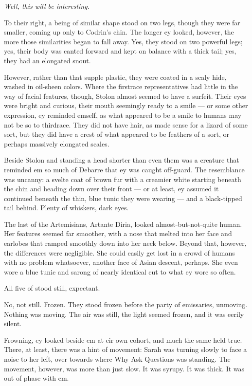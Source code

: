 \emph{Well, this will be interesting.}

To their right, a being of similar shape stood on two legs, though they were far smaller, coming up only to Codrin's chin. The longer ey looked, however, the more those similarities began to fall away. Yes, they stood on two powerful legs; yes, their body was canted forward and kept on balance with a thick tail; yes, they had an elongated snout.

However, rather than that supple plastic, they were coated in a scaly hide, washed in oil-sheen colors. Where the firstrace representatives had little in the way of facial features, though, Stolon almost seemed to have a surfeit. Their eyes were bright and curious, their mouth seemingly ready to a smile — or some other expression, ey reminded emself, as what appeared to be a smile to humans may not be so to thirdrace. They did not have hair, as made sense for a lizard of some sort, but they did have a crest of what appeared to be feathers of a sort, or perhaps massively elongated scales.

Beside Stolon and standing a head shorter than even them was a creature that reminded em so much of Debarre that ey was caught off-guard. The resemblance was uncanny: a svelte coat of brown fur with a creamier white starting beneath the chin and heading down over their front — or at least, ey assumed it continued beneath the thin, blue tunic they were wearing — and a black-tipped tail behind. Plenty of whiskers, dark eyes.

The last of the Artemisians, Artante Diria, looked almost-but-not-quite human. Her features seemed far smoother, with a nose that melted into her face and earlobes that ramped smoothly down into her neck below. Beyond that, however, the differences were negligible. She could easily get lost in a crowd of humans with no problem whatsoever, another face of Asian descent, perhaps. She even wore a blue tunic and sarong of nearly identical cut to what ey wore so often.

All five of stood still, expectant.

No, not still. Frozen. They stood frozen before the party of emissaries, unmoving. Nothing was moving. The air was still, the light seemed frozen, and it was eerily silent.

Frowning, ey looked beside em at eir own cohort, and much the same held true. There, at least, there was a hint of movement: Sarah was turning slowly to face a noise to her left, over towards where Why Ask Questions was standing. The movement, however, was more than just slow. It was syrupy. It was thick. It was out of phase with em.

